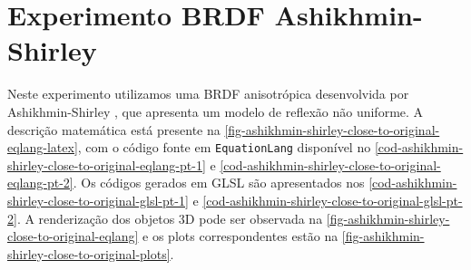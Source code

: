\section{Experimento BRDF Ashikhmin-Shirley}\label{sec:ashikhmin-shirley}

Neste experimento utilizamos uma BRDF anisotrópica desenvolvida por Ashikhmin-Shirley \cite{ashikhmin2000anisotropic}, que apresenta um modelo de reflexão não uniforme. A descrição matemática está presente na \autoref{fig-ashikhmin-shirley-close-to-original-eqlang-latex}, com o código fonte em \texttt{EquationLang} disponível no \autoref{cod-ashikhmin-shirley-close-to-original-eqlang-pt-1} e \autoref{cod-ashikhmin-shirley-close-to-original-eqlang-pt-2}. Os códigos gerados em GLSL são apresentados nos \autoref{cod-ashikhmin-shirley-close-to-original-glsl-pt-1} e \autoref{cod-ashikhmin-shirley-close-to-original-glsl-pt-2}. A renderização dos objetos 3D pode ser observada na \autoref{fig-ashikhmin-shirley-close-to-original-eqlang} e os plots correspondentes estão na \autoref{fig-ashikhmin-shirley-close-to-original-plots}.

